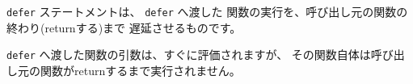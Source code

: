 \texttt{defer} ステートメントは、 \texttt{defer} へ渡した
関数の実行を、呼び出し元の関数の終わり(returnする)まで
遅延させるものです。

\texttt{defer} へ渡した関数の引数は、すぐに評価されますが、
その関数自体は呼び出し元の関数がreturnするまで実行されません。